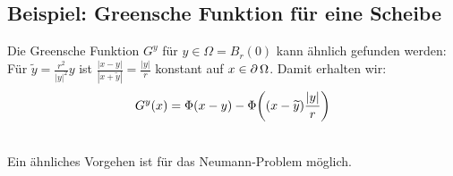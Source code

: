 \subsection{Beispiel: Greensche Funktion für eine Scheibe} 
\label{bsp_50}
	Die Greensche Funktion $G^y$ \marginnote{[50]} für $y \in \Omega = B_r(0)$ kann ähnlich gefunden werden: Für $\widetilde{y} = \frac{r^2}{|y|^2}y$ ist $\frac{|x-y|}{|x+\widetilde{y}|} = \frac{|y|}{r}$ konstant auf $x \in \operatorname{\partial} \Omega$. Damit erhalten wir:
	\[ G^y(x) = \Phi(x-y) - \Phi \enbrace*{(x-\widetilde{y}) \frac{|y|}{r}} \]

\mbox{} \\
Ein ähnliches Vorgehen ist für das Neumann-Problem möglich.
\newpage